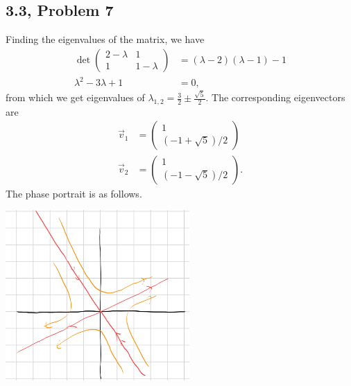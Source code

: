 \documentclass[10pt]{mypackage}
\begin{document}
\subsection{3.3, Problem 7}%
Finding the eigenvalues of the matrix, we have
\begin{align*}
  \det \begin{pmatrix}2-\lambda & 1 \\ 1 & 1 - \lambda\end{pmatrix} &= \left(\lambda - 2\right)\left(\lambda - 1\right) - 1\\
  \lambda^2 - 3\lambda + 1 &= 0,
\end{align*}
from which we get eigenvalues of $\lambda_{1,2} = \frac{3}{2}\pm \frac{\sqrt{5}}{2}$. The corresponding eigenvectors are
\begin{align*}
  \vec{v}_1 &= \begin{pmatrix}1\\ \left(-1 + \sqrt{5}\right)/2\end{pmatrix}\\
\vec{v}_2 &= \begin{pmatrix}1\\\left(-1-\sqrt{5}\right)/2\end{pmatrix}.
\end{align*}
The phase portrait is as follows.
\begin{center}
  \includegraphics[width=7cm]{images/3_3_7.png}
\end{center}
\end{document}
